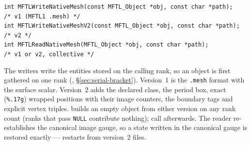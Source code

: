 \begin{lstlisting}[numbers=none]
int MFTLWriteNativeMesh(const MFTL_Object *obj, const char *path);    /* v1 (MFTL1 .mesh) */
int MFTLWriteNativeMeshV2(const MFTL_Object *obj, const char *path);  /* v2 */
int MFTLReadNativeMesh(MFTL_Object *obj, const char *path);           /* v1 or v2, collective */
\end{lstlisting}
The writers write the entities stored on the calling rank, so an object is first gathered on
one rank (, \S\ref{sec:serial-bracket}). Version~1 is the
\mftlone{} \texttt{.mesh} format with the surface scalar. Version~2 adds the declared class, the
period box, exact (\texttt{\%.17g}) wrapped positions with their image counters, the boundary
tags and explicit vertex triples.  builds an empty object from either
version on any rank count (ranks that pass \texttt{NULL} contribute nothing); call
 afterwards. The reader re-establishes the canonical image gauge, so a
state written in the canonical gauge is restored exactly --- \multi{} restarts from version~2
files.
